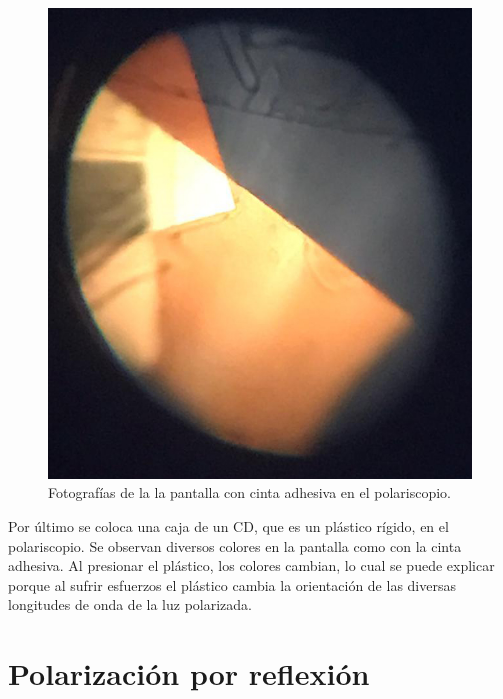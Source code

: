 \documentclass[12pt]{article}
\numberwithin{table}{section}
\numberwithin{figure}{section}
\numberwithin{equation}{section}
\begin{document}
\begin{figure}[!ht]
\begin{minipage}{0.45\textwidth}
		\includegraphics[scale = 0.25]{P5Celo2.jpg}
	\end{minipage}
\caption{Fotografías de la la pantalla con cinta adhesiva en el polariscopio.}\label{P5colorines}
\end{figure}

Por último se coloca una caja de un CD, que es un plástico rígido, en el polariscopio. Se observan diversos colores en la pantalla como con la cinta adhesiva. Al presionar el plástico, los colores cambian, lo cual se puede explicar porque al sufrir esfuerzos el plástico cambia la orientación de las diversas longitudes de onda de la luz polarizada.

\section{Polarización por reflexión}
\end{document}

